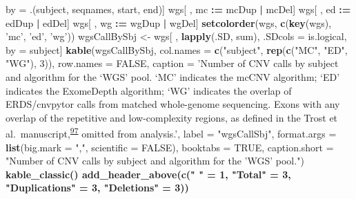 \documentclass[11pt,letterpaper]{book}
\newenvironment{Shaded}{\begin{snugshade}}{\end{snugshade}}
\newcommand{\DataTypeTok}[1]{\textcolor[rgb]{0.13,0.29,0.53}{#1}}
\newcommand{\DecValTok}[1]{\textcolor[rgb]{0.00,0.00,0.81}{#1}}
\newcommand{\ErrorTok}[1]{\textcolor[rgb]{0.64,0.00,0.00}{\textbf{#1}}}
\newcommand{\KeywordTok}[1]{\textcolor[rgb]{0.13,0.29,0.53}{\textbf{#1}}}
\newcommand{\NormalTok}[1]{#1}
\newcommand{\OperatorTok}[1]{\textcolor[rgb]{0.81,0.36,0.00}{\textbf{#1}}}
\newcommand{\OtherTok}[1]{\textcolor[rgb]{0.56,0.35,0.01}{#1}}
\newcommand{\StringTok}[1]{\textcolor[rgb]{0.31,0.60,0.02}{#1}}
\begin{document}
\begin{Shaded}
\begin{Highlighting}[]
{{{{{{{{{{{\NormalTok{           by =}\StringTok{ }\NormalTok{.(subject, seqnames, start, end)]}
\NormalTok{wgs[ , mc }\OperatorTok{:}\ErrorTok{=}\StringTok{ }\NormalTok{mcDup }\OperatorTok{|}\StringTok{ }\NormalTok{mcDel]}
\NormalTok{wgs[ , ed }\OperatorTok{:}\ErrorTok{=}\StringTok{ }\NormalTok{edDup }\OperatorTok{|}\StringTok{ }\NormalTok{edDel]}
\NormalTok{wgs[ , wg }\OperatorTok{:}\ErrorTok{=}\StringTok{ }\NormalTok{wgDup }\OperatorTok{|}\StringTok{ }\NormalTok{wgDel]}
\KeywordTok{setcolorder}\NormalTok{(wgs, }\KeywordTok{c}\NormalTok{(}\KeywordTok{key}\NormalTok{(wgs), }\StringTok{'mc'}\NormalTok{, }\StringTok{'ed'}\NormalTok{, }\StringTok{'wg'}\NormalTok{))}
\NormalTok{wgsCallBySbj <-}\StringTok{ }\NormalTok{wgs[ , }\KeywordTok{lapply}\NormalTok{(.SD, sum), .SDcols =}\StringTok{ }\NormalTok{is.logical, by =}\StringTok{ }\NormalTok{subject]}
\KeywordTok{kable}\NormalTok{(wgsCallBySbj,}
      \DataTypeTok{col.names =} \KeywordTok{c}\NormalTok{(}\StringTok{"subject"}\NormalTok{, }\KeywordTok{rep}\NormalTok{(}\KeywordTok{c}\NormalTok{(}\StringTok{"MC"}\NormalTok{, }\StringTok{"ED"}\NormalTok{, }\StringTok{"WG"}\NormalTok{), }\DecValTok{3}\NormalTok{)),}
      \DataTypeTok{row.names =} \OtherTok{FALSE}\NormalTok{, }
      \DataTypeTok{caption =} \StringTok{'Number of CNV calls by subject and algorithm for the `WGS' pool. `MC' indicates the mcCNV algorithm; `ED' indicates the ExomeDepth algorithm; `WG' indicates the overlap of ERDS/cnvpytor calls from matched whole-genome sequencing. Exons with any overlap of the repetitive and low-complexity regions, as defined in the Trost et al.~manuscript,\textsuperscript{\protect\hyperlink{ref-trost:2018aa}{97}} omitted from analysis.'}\NormalTok{,}
      \DataTypeTok{label =} \StringTok{"wgsCallSbj"}\NormalTok{,}
      \DataTypeTok{format.args =} \KeywordTok{list}\NormalTok{(}\DataTypeTok{big.mark =} \StringTok{","}\NormalTok{, }\DataTypeTok{scientific =} \OtherTok{FALSE}\NormalTok{),}
      \DataTypeTok{booktabs =} \OtherTok{TRUE}\NormalTok{,}
      \DataTypeTok{caption.short =} \StringTok{"Number of CNV calls by subject and algorithm for the 'WGS' pool."}\NormalTok{) }\OperatorTok{%>%}
\StringTok{  }\KeywordTok{kable_classic}\NormalTok{() }\OperatorTok{%>%}
\StringTok{  }\KeywordTok{add_header_above}\NormalTok{(}\KeywordTok{c}\NormalTok{(}\StringTok{" "}\NormalTok{ =}\StringTok{ }\DecValTok{1}\NormalTok{, }\StringTok{"Total"}\NormalTok{ =}\StringTok{ }\DecValTok{3}\NormalTok{, }\StringTok{"Duplications"}\NormalTok{ =}\StringTok{ }\DecValTok{3}\NormalTok{, }\StringTok{"Deletions"}\NormalTok{ =}\StringTok{ }\DecValTok{3}\NormalTok{))}
}}}}}}}}}}}}}
\end{Highlighting}
\end{Shaded}
\end{document}
